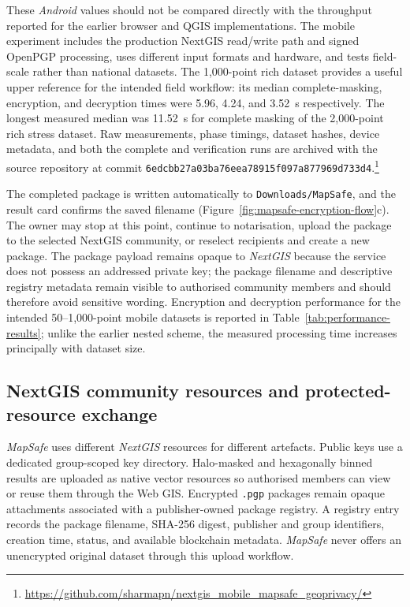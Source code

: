 \documentclass[]{interact}
\begin{document}
These \textit{Android} values should not be compared directly with the throughput reported for the earlier browser and QGIS implementations. The mobile experiment includes the production NextGIS read/write path and signed OpenPGP processing, uses different input formats and hardware, and tests field-scale rather than national datasets. The 1,000-point rich dataset provides a useful upper reference for the intended field workflow: its median complete-masking, encryption, and decryption times were 5.96, 4.24, and 3.52~s respectively. The longest measured median was 11.52~s for complete masking of the 2,000-point rich stress dataset. Raw measurements, phase timings, dataset hashes, device metadata, and both the complete and verification runs are archived with the source repository at commit \texttt{6edcbb27a03ba76eea78915f097a877969d733d4}.\footnote{\url{https://github.com/sharmapn/nextgis_mobile_mapsafe_geoprivacy/}}

The completed package is written automatically to \texttt{Downloads/MapSafe}, and the result card confirms the saved filename (Figure~\ref{fig:mapsafe-encryption-flow}c). The owner may stop at this point, continue to notarisation, upload the package to the selected NextGIS community, or reselect recipients and create a new package. The package payload remains opaque to \textit{NextGIS} because the service does not possess an addressed private key; the package filename and descriptive registry metadata remain visible to authorised community members and should therefore avoid sensitive wording. Encryption and decryption performance for the intended 50--1,000-point mobile datasets is reported in Table~\ref{tab:performance-results}; unlike the earlier nested scheme, the measured processing time increases principally with dataset size.

\FloatBarrier
\subsection{NextGIS community resources and protected-resource exchange}
\label{sec:community-packages}

\textit{MapSafe} uses different \textit{NextGIS} resources for different artefacts. Public keys use a dedicated group-scoped key directory. Halo-masked and hexagonally binned results are uploaded as native vector resources so authorised members can view or reuse them through the Web GIS. Encrypted \texttt{.pgp} packages remain opaque attachments associated with a publisher-owned package registry. A registry entry records the package filename, SHA-256 digest, publisher and group identifiers, creation time, status, and available blockchain metadata. \textit{MapSafe} never offers an unencrypted original dataset through this upload workflow.
\end{document}
